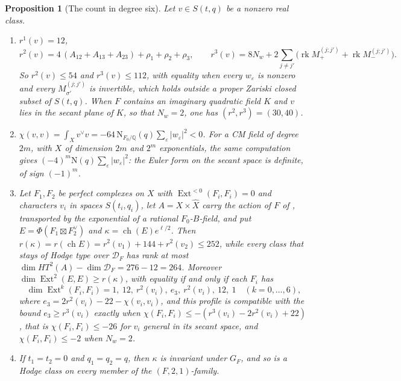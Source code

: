 \documentclass[11pt,reqno]{amsart}
\theoremstyle{plain}
\newtheorem{proposition}[theorem]{Proposition}
\theoremstyle{definition}
\theoremstyle{remark}
\newcommand{\QQ}{\mathbb{Q}}
\newcommand{\cD}{\mathcal{D}}
\newcommand{\Nm}{\mathrm{N}}             %
\DeclareMathOperator{\ch}{ch}
\DeclareMathOperator{\rk}{rk}
\DeclareMathOperator{\Ext}{Ext}
\begin{document}
\begin{proposition}[The count in degree six]\label{prop:sexticcount}
Let $v\in S(t,q)$ be a nonzero real class.
\begin{enumerate}[label=\textup{(\roman*)},leftmargin=2.6em,itemsep=2pt]
\item $r^{1}(v)=12$,
  \[
    r^{2}(v)=4\,(A_{12}+A_{13}+A_{23})+\rho_{1}+\rho_{2}+\rho_{3},
    \qquad
    r^{3}(v)=8N_{w}+2\sum_{j\ne j'}\bigl(\rk M^{(j;j')}_{+}+\rk M^{(j;j')}_{-}\bigr).
  \]
  So $r^{2}(v)\le54$ and $r^{3}(v)\le112$, with equality when every
  $w_{\varepsilon}$ is nonzero and every $M^{(j;j')}_{\sigma'}$ is invertible,
  which holds outside a proper Zariski closed subset of $S(t,q)$. When $F$
  contains an imaginary quadratic field $K$ and $v$ lies in the secant plane
  of $K$, so that $N_{w}=2$, one has $(r^{2},r^{3})=(30,40)$.
\item $\chi(v,v)=\int_{X}v^{\vee}v=-64\,\Nm_{F_{0}/\QQ}(q)\sum_{\varepsilon}
  |w_{\varepsilon}|^{2}<0$. For a CM field of degree $2m$, with $X$ of dimension
  $2m$ and $2^{m}$ exponentials, the same computation gives
  $(-4)^{m}\Nm(q)\sum_{\varepsilon}|w_{\varepsilon}|^{2}$: the Euler form on
  the secant space is definite, of sign $(-1)^{m}$.
\item Let $F_{1},F_{2}$ be perfect complexes on $X$ with
  $\Ext^{<0}(F_{i},F_{i})=0$ and characters $v_{i}$ in spaces
  $S(t_{i},q_{i})$, let $A=X\times\widehat{X}$ carry the action of $F$ of
  \cite[\S11.1]{Mar25c}, transported by the exponential of a rational
  $F_{0}$-$B$-field, and put
  $E=\Phi(F_{1}\boxtimes F_{2}^{\vee})$ and $\kappa=\ch(E)e^{\ell/2}$. Then
  $r(\kappa)=r(\ch E)=r^{2}(v_{1})+144+r^{2}(v_{2})\le252$, while every class
  that stays of Hodge type over $\cD_{F}$ has rank at most
  $\dim HT^{2}(A)-\dim\cD_{F}=276-12=264$. Moreover
  $\dim\Ext^{2}(E,E)\ge r(\kappa)$, with equality if and only if each $F_{i}$
  has
  \[
    \dim\Ext^{k}(F_{i},F_{i})=1,\ 12,\ r^{2}(v_{i}),\ e_{3},\ r^{2}(v_{i}),\ 12,\ 1
    \quad(k=0,\dots,6),
  \]
  where $e_{3}=2r^{2}(v_{i})-22-\chi(v_{i},v_{i})$,
  and this profile is compatible with the bound $e_{3}\ge r^{3}(v_{i})$ exactly
  when $\chi(F_{i},F_{i})\le-(r^{3}(v_{i})-2r^{2}(v_{i})+22)$, that is
  $\chi(F_{i},F_{i})\le-26$ for $v_{i}$ general in its secant space, and
  $\chi(F_{i},F_{i})\le-2$ when $N_{w}=2$.
\item If $t_{1}=t_{2}=0$ and $q_{1}=q_{2}=q$, then $\kappa$ is invariant
  under $G_{F}$, and so is a Hodge class on every member of the
  $(F,2,1)$-family.
\end{enumerate}
\end{proposition}
\end{document}
